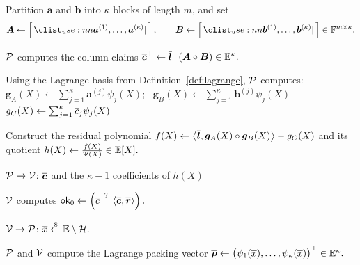\begin{algorithm}[!t]
\caption{Packed Hadamard-product proof}
\label{alg:hadamard}

Partition \(\bm a\) and \(\bm b\) into \(\kappa\) blocks of
length \(m\), and set
\[
    \bm A
    \leftarrow
    \concat{
        \bm a^{(1)},\ldots,\bm a^{(\kappa)}
    },
    \qquad
    \bm B
    \leftarrow
    \concat{
        \bm b^{(1)},\ldots,\bm b^{(\kappa)}
    }
    \in\Field^{m\times\kappa}.
\]

\(\mathcal{P}\) computes the column claims
\(
    \overline{\bm c}^{\top}
    \leftarrow
    \overline{\bm l}^{\top}
    (\bm A\circ\bm B)
    \in\mathbb{E}^\kappa.
\)

Using the Lagrange basis from
Definition~\ref{def:lagrange}, \(\mathcal{P}\) computes:\\
\Indp
\(    \bm g_A(X)
    \leftarrow
    \sum_{j=1}^{\kappa}
    \bm a^{(j)}\psi_j(X)
\);~
\(
    \bm g_B(X)
    \leftarrow
    \sum_{j=1}^{\kappa}
    \bm b^{(j)}\psi_j(X)
\)\;
\(
    g_C(X)
    \leftarrow
    \sum_{j=1}^{\kappa}
    \overline{c}_j\psi_j(X)
\)\;

Construct the residual polynomial
\(
    f(X)
    \leftarrow
    \left\langle
        \overline{\bm l},
        \bm g_A(X)\circ\bm g_B(X)
    \right\rangle
    -
    g_C(X)
\)
and its quotient
\(
    h(X)
    \leftarrow
    \frac{f(X)}{\Psi(X)}
    \in\mathbb{E}[X].
\)
\Indm

\({\mathcal{P} \rightarrow \mathcal{V}}\):
\(\overline{\bm c}\) and the \(\kappa-1\) coefficients of \(h(X)\)\;

\(\mathcal{V}\) computes
\(
    \mathsf{ok}_0
    \leftarrow
    \left(
        \overline{c}
        \mathrel{\overset{\mathrm{?}}{=}}
        \left\langle
            \overline{\bm c},\overline{\bm r}
        \right\rangle
    \right).
\)

\({\mathcal{V} \rightarrow \mathcal{P}}\):
\(
    \overline{x}
    \mathrel{\xleftarrow{\$}}
    \mathbb{E}\setminus\mathcal H.
\)

\(\mathcal{P}\) and \(\mathcal{V}\) compute the Lagrange packing vector
\(
    \overline{\bm\rho}
    \leftarrow
    \bigl(
        \psi_1(\overline{x}),
        \ldots,
        \psi_\kappa(\overline{x})
    \bigr)^\top
    \in\mathbb{E}^\kappa.
\)


\end{algorithm}
